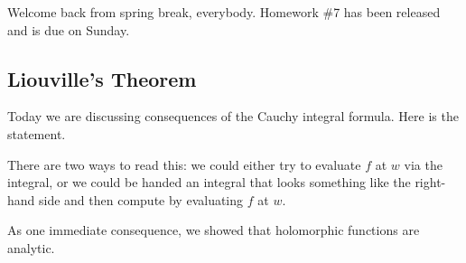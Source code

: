 
Welcome back from spring break, everybody. Homework \#7 has been released and is due on Sunday.

\subsection{Liouville's Theorem}
Today we are discussing consequences of the Cauchy integral formula. Here is the statement.
\thmcif*
\begin{remark}
	There are two ways to read this: we could either try to evaluate $f$ at $w$ via the integral, or we could be handed an integral that looks something like the right-hand side and then compute by evaluating $f$ at $w$.
\end{remark}
As one immediate consequence, we showed that holomorphic functions are analytic.

